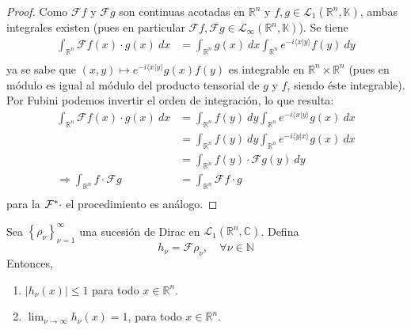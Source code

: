 \documentclass[12pt]{report}
\newcounter{it}
\theoremstyle{largebreak}
\renewcommand{\leq}{\ensuremath{\leqslant}}
\newcommand\abs[1]{\ensuremath{\left|#1\right|}}
\newcommand\pint[2]{\ensuremath{\langle#1| #2\rangle}}
\newcommand{\fou}[1]{\ensuremath{\mathcal{F}#1}}
\begin{document}
    \begin{proof}
        Como $\fou{f}$ y $\fou{g}$ son continuas acotadas en $\mathbb{R}^n$ y $f,g\in\mathcal{L}_1(\mathbb{R}^n,\mathbb{K})$, ambas integrales existen (pues en particular $\fou{f},\fou{g}\in\mathcal{L}_{\infty}(\mathbb{R}^n,\mathbb{K})$). Se tiene
        \begin{equation*}
            \begin{split}
                \int_{\mathbb{R}^n}\fou{f}(x)\cdot g(x)\:dx&=\int_{\mathbb{R}^n}g(x)\:dx\int_{\mathbb{R}^n}e^{ -i\pint{x}{y}}f(y)\:dy\\
            \end{split}
        \end{equation*}
        ya se sabe que $(x,y)\mapsto e^{ -i\pint{x}{y}}g(x)f(y)$ es integrable en $\mathbb{R}^n\times\mathbb{R}^n$ (pues en módulo es igual al módulo del producto tensorial de $g$ y $f$, siendo éste integrable). Por Fubini podemos invertir el orden de integración, lo que resulta:
        \begin{equation*}
            \begin{split}
                \int_{\mathbb{R}^n}\fou{f}(x)\cdot g(x)\:dx&=\int_{\mathbb{R}^n}f(y)\:dy\int_{\mathbb{R}^n}e^{ -i\pint{x}{y}}g(x)\:dx\\
                &=\int_{\mathbb{R}^n}f(y)\:dy\int_{\mathbb{R}^n}e^{ -i\pint{y}{x}}g(x)\:dx\\
                &=\int_{\mathbb{R}^n}f(y)\cdot\fou{g}(y)\:dy\\
                \Rightarrow \int_{\mathbb{R}^n}f\cdot\fou{g}&=\int_{\mathbb{R}^n}\fou{f}\cdot g\\
            \end{split}
        \end{equation*}
        para la $\fou^*{\cdot}$ el procedimiento es análogo.
    \end{proof}

    \begin{lema}
        Sea $\left\{\rho_\nu \right\}_{\nu=1}^\infty$ una sucesión de Dirac en $\mathcal{L}_1(\mathbb{R}^n,\mathbb{C})$. Defina
        \begin{equation*}
            h_\nu=\fou{\rho_\nu},\quad\forall\nu\in\mathbb{N}
        \end{equation*}
        Entonces,
        \begin{enumerate}
            \item $\abs{h_\nu(x)}\leq1$ para todo $x\in\mathbb{R}^n$.
            \item $\lim_{\nu\rightarrow\infty}h_\nu(x)=1$, para todo $x\in\mathbb{R}^n$.
        \end{enumerate}
    \end{lema}
\end{document}
